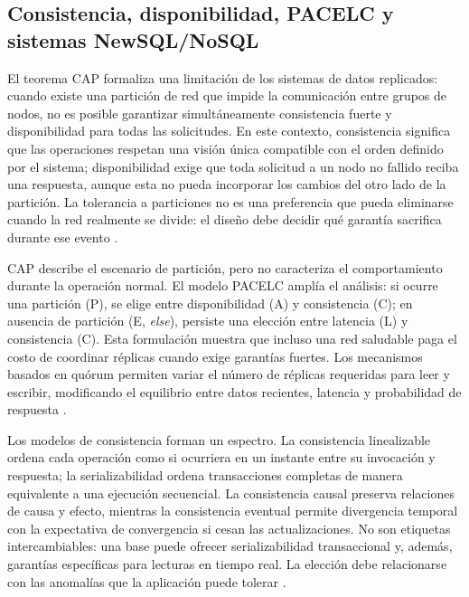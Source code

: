 \documentclass[12pt,a4paper]{article}
\begin{document}
\subsection{Consistencia, disponibilidad, PACELC y sistemas NewSQL/NoSQL}
\label{subsec:cap-pacelc}

El teorema CAP formaliza una limitación de los sistemas de datos replicados: cuando existe una partición de red que impide la comunicación entre grupos de nodos, no es posible garantizar simultáneamente consistencia fuerte y disponibilidad para todas las solicitudes. En este contexto, consistencia significa que las operaciones respetan una visión única compatible con el orden definido por el sistema; disponibilidad exige que toda solicitud a un nodo no fallido reciba una respuesta, aunque esta no pueda incorporar los cambios del otro lado de la partición. La tolerancia a particiones no es una preferencia que pueda eliminarse cuando la red realmente se divide: el diseño debe decidir qué garantía sacrifica durante ese evento \cite{gilbert2002cap,viotti2016consistency}.

CAP describe el escenario de partición, pero no caracteriza el comportamiento durante la operación normal. El modelo PACELC amplía el análisis: si ocurre una partición (P), se elige entre disponibilidad (A) y consistencia (C); en ausencia de partición (E, \textit{else}), persiste una elección entre latencia (L) y consistencia (C). Esta formulación muestra que incluso una red saludable paga el costo de coordinar réplicas cuando exige garantías fuertes. Los mecanismos basados en quórum permiten variar el número de réplicas requeridas para leer y escribir, modificando el equilibrio entre datos recientes, latencia y probabilidad de respuesta \cite{noudoust2022quorum,ferreira2024consistency}.

Los modelos de consistencia forman un espectro. La consistencia linealizable ordena cada operación como si ocurriera en un instante entre su invocación y respuesta; la serializabilidad ordena transacciones completas de manera equivalente a una ejecución secuencial. La consistencia causal preserva relaciones de causa y efecto, mientras la consistencia eventual permite divergencia temporal con la expectativa de convergencia si cesan las actualizaciones. No son etiquetas intercambiables: una base puede ofrecer serializabilidad transaccional y, además, garantías específicas para lecturas en tiempo real. La elección debe relacionarse con las anomalías que la aplicación puede tolerar \cite{viotti2016consistency,kleppmann2017ddia}.
\end{document}
